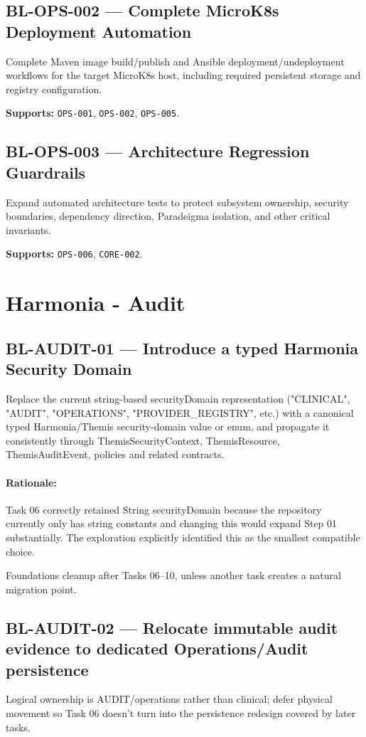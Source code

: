 \subsection{BL-OPS-002 --- Complete MicroK8s Deployment Automation}
Complete Maven image build/publish and Ansible deployment/undeployment workflows for the target MicroK8s host, including required persistent storage and registry configuration.

\textbf{Supports:} \texttt{OPS-001}, \texttt{OPS-002}, \texttt{OPS-005}.

\subsection{BL-OPS-003 --- Architecture Regression Guardrails}
Expand automated architecture tests to protect subsystem ownership, security boundaries, dependency direction, Paradeigma isolation, and other critical invariants.

\textbf{Supports:} \texttt{OPS-006}, \texttt{CORE-002}.

\section{Harmonia - Audit}
\subsection{BL-AUDIT-01 — Introduce a typed Harmonia Security Domain}

Replace the current string-based securityDomain representation ("CLINICAL", "AUDIT", "OPERATIONS", "PROVIDER_REGISTRY", etc.) with a canonical typed Harmonia/Themis security-domain value or enum, and propagate it consistently through ThemisSecurityContext, ThemisResource, ThemisAuditEvent, policies and related contracts.

\paragraph{Rationale:} Task 06 correctly retained String securityDomain because the repository currently only has string constants and changing this would expand Step 01 substantially. The exploration explicitly identified this as the smallest compatible choice.

 Foundations cleanup after Tasks 06–10, unless another task creates a natural migration point.

\subsection{BL-AUDIT-02 — Relocate immutable audit evidence to dedicated Operations/Audit persistence} 
Logical ownership is AUDIT/operations rather than clinical; defer physical movement so Task 06 doesn't turn into the persistence redesign covered by later tasks.

